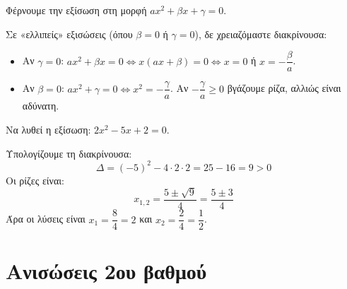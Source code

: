 \bhmata
\begin{bhma}
    \item Φέρνουμε την εξίσωση στη μορφή $a x^2 + \beta x + \gamma = 0$.
    \item Σε «ελλιπείς» εξισώσεις (όπου $\beta = 0$ ή $\gamma = 0$), δε χρειαζόμαστε διακρίνουσα:
    \begin{itemize}
        \item Αν $\gamma = 0$: $a x^2 + \beta x = 0 \Leftrightarrow x(a x + \beta) = 0 \Leftrightarrow x = 0$ ή $x = -\dfrac{\beta}{a}$.
        \item Αν $\beta = 0$: $a x^2 + \gamma = 0 \Leftrightarrow x^2 = -\dfrac{\gamma}{a}$. Αν $-\dfrac{\gamma}{a} \geq 0$ βγάζουμε ρίζα, αλλιώς είναι αδύνατη.
    \end{itemize}
\end{bhma}


Να λυθεί η εξίσωση: $2x^2 - 5x + 2 = 0$.

\lysh
Υπολογίζουμε τη διακρίνουσα: 
\[ \Delta = (-5)^2 - 4 \cdot 2 \cdot 2 = 25 - 16 = 9 > 0 \]
Οι ρίζες είναι:
\[ x_{1,2} = \dfrac{5 \pm \sqrt{9}}{4} = \dfrac{5 \pm 3}{4} \]
Άρα οι λύσεις είναι $x_1 = \dfrac{8}{4} = 2$ και $x_2 = \dfrac{2}{4} = \dfrac{1}{2}$.

\section{Ανισώσεις 2ου βαθμού}

